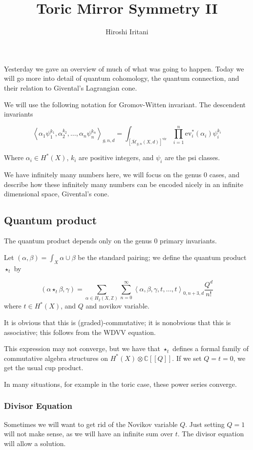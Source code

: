 \documentclass{amsart}
\author{Hiroshi Iritani}
\title{Toric Mirror Symmetry II}
\theoremstyle{definition}
\newcommand{\Z}{\mathbb{Z}}
\newcommand{\Mbar}{\overline{\mathcal{M}}}
\newcommand{\C}{\mathbb{C}}
\newcommand{\ev}{\text{ev}}
\newcommand{\vir}{\text{vir}}
\begin{document}
\maketitle
Yesterday we gave an overview of much of what was going to happen.  Today we will go more into detail of quantum cohomology, the quantum connection, and their relation to Givental's Lagrangian cone.

We will use the following notation for Gromov-Witten invariant.  The descendent invariants

$$\left\langle \alpha_1\psi_1^{k_1},\alpha_2^{k_2},\dots,\alpha_n\psi_n^{k_n}\right\rangle_{g,n,d}=\int_{[\Mbar_{g,n}(X,d)]^\vir}\prod_{i=1}^n \ev_i^*(\alpha_i)\psi_i^{k_i}$$

Where $\alpha_i\in H^*(X)$, $k_i$ are positive integers, and $\psi_i$ are the psi classes.

We have infinitely many numbers here, we will focus on the genus 0 cases, and describe how these infinitely many numbers can be encoded nicely in an infinite dimensional space, Givental's cone.

\subsection{Quantum product}
The quantum product depends only on the genus 0 primary invariants.

Let $(\alpha, \beta)=\int_X \alpha\cup \beta$ be the standard pairing; we define the quantum product $\star_t$ by

$$(\alpha \star_t\beta,\gamma)=\sum_{\alpha\in H_2(X,\Z)}\sum_{n=0}^\infty \left\langle\alpha,\beta,\gamma,t,\dots,t\right\rangle_{0,n+3,d}\frac{Q^d}{n!}$$
where $t\in H^*(X)$, and $Q$ and novikov variable.

It is obvious that this is (graded)-commutative; it is nonobvious that this is associative; this follows from the WDVV equation.

This expression may not converge, but we have that $\star_t$ defines a formal family of commutative algebra structures on $H^*(X)\otimes\C[[Q]]$.  If we set $Q=t=0$, we get the usual cup product.

In many situations, for example in the toric case, these power series converge.


\subsubsection{Divisor Equation}
Sometimes we will want to get rid of the Novikov variable $Q$.  Just setting $Q=1$ will not make sense, as we will have an infinite sum over $t$.  The divisor equation will allow a solution.
\end{document}
